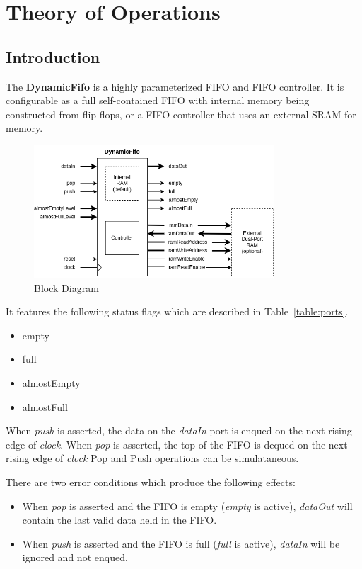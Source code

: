 \section{Theory of Operations}

\subsection{Introduction}
The \textbf{DynamicFifo} is a highly parameterized FIFO and FIFO controller. It
is configurable as a full self-contained FIFO with internal memory being 
constructed from flip-flops, or a FIFO controller that uses an external SRAM 
for memory.

\begin{figure}[h]
  \includegraphics[width=0.80\textwidth]{images/block-diagram.png}
  \caption{Block Diagram}\label{fig:block-diagram}
\end{figure}

It features the following status flags which are described in
Table~\ref{table:ports}.

\begin{itemize}[noitemsep]
  \item{empty}
  \item{full}
  \item{almostEmpty}
  \item{almostFull}
\end{itemize}

When \textit{push} is asserted, the data on the \textit{dataIn} port is enqued
on the next rising edge of \textit{clock}. When \textit{pop} is asserted, the
top of the FIFO is dequed on the next rising edge of \textit{clock} Pop and Push
operations can be simulataneous.

There are two error conditions which produce the following effects:
\begin{itemize}
  \item{When \textit{pop} is asserted and the FIFO is empty (\textit{empty} is
        active), \textit{dataOut} will contain the last valid data held in
        the FIFO.}
  \item{When \textit{push} is asserted and the FIFO is full (\textit{full} is
        active), \textit{dataIn} will be ignored and not enqued.}
\end{itemize}

